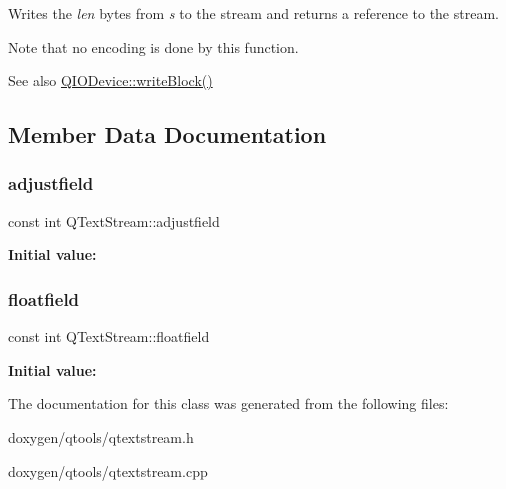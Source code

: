 Writes the {\itshape len} bytes from {\itshape s} to the stream and returns a reference to the stream.

Note that no encoding is done by this function.

\begin{DoxySeeAlso}{See also}
\mbox{\hyperlink{class_q_i_o_device_a5d937df1bde2f956872dd54e077807d1}{Q\+I\+O\+Device\+::write\+Block()}} 
\end{DoxySeeAlso}


\subsection{Member Data Documentation}
\mbox{\label{class_q_text_stream_a22f60cd97e89709d1f32e9d2555d85a9}} 
\subsubsection{\texorpdfstring{adjustfield}{adjustfield}}
{\footnotesize\ttfamily const int Q\+Text\+Stream\+::adjustfield\hspace{0.3cm}{\ttfamily [static]}}

{\bfseries Initial value\+:}
\begin{DoxyCode}{0}

\end{DoxyCode}
\mbox{\label{class_q_text_stream_a01b7c551fcbc8389b7dffa2348a57066}} 
\subsubsection{\texorpdfstring{floatfield}{floatfield}}
{\footnotesize\ttfamily const int Q\+Text\+Stream\+::floatfield\hspace{0.3cm}{\ttfamily [static]}}

{\bfseries Initial value\+:}
\begin{DoxyCode}{0}

\end{DoxyCode}


The documentation for this class was generated from the following files\+:\begin{DoxyCompactItemize}
\item 
doxygen/qtools/qtextstream.\+h\item 
doxygen/qtools/qtextstream.\+cpp\end{DoxyCompactItemize}
